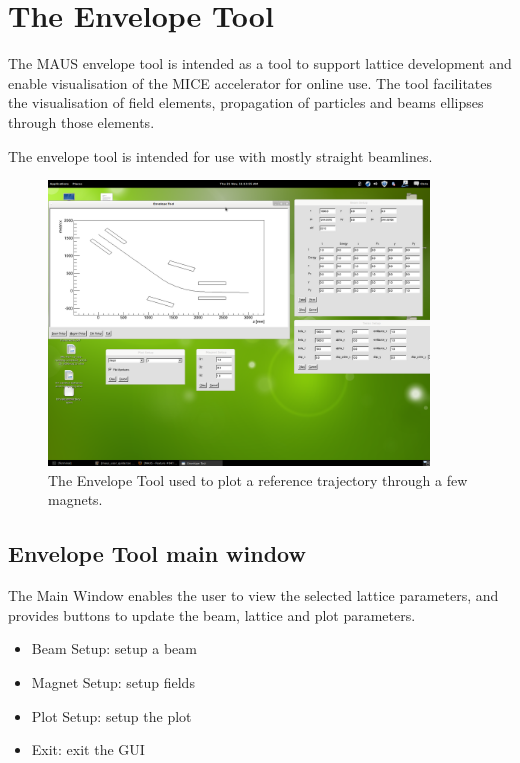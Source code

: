 \chapter{The Envelope Tool}

The MAUS envelope tool is intended as a tool to support lattice development and
enable visualisation of the MICE accelerator for online use. The tool 
facilitates the visualisation of field elements, propagation of particles and
beams ellipses through those elements.

The envelope tool is intended for use with mostly straight beamlines.

\begin{figure}[!htb]
\centering
\includegraphics[width=0.9\textwidth]{envelope_tool.png}
\caption{The Envelope Tool used to plot a reference trajectory through a few magnets.}
\end{figure}

\section{Envelope Tool main window}
The Main Window enables the user to view the selected lattice parameters, and
provides buttons to update the beam, lattice and plot parameters.

\begin{itemize}
\item Beam Setup: setup a beam
\item Magnet Setup: setup fields
\item Plot Setup: setup the plot
\item Exit: exit the GUI
\end{itemize}

